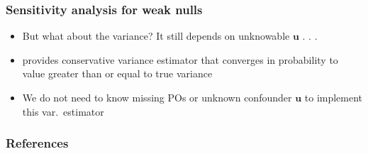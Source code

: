 \documentclass[table, xcolor = {dvipsnames}, 9pt]{beamer}
\theoremstyle{plain}
\begin{document}
\begin{frame}[t]
\frametitle{Sensitivity analysis for weak nulls}
\vfill
\begin{itemize} \vfill
\item But what about the variance? It still depends on unknowable $\bm{u}$ . . .  \vfill
\item \citet{fogarty2018} provides conservative variance estimator that converges in probability to value greater than or equal to true variance \vfill
\item We do not need to know missing POs or unknown confounder $\bm{u}$ to implement this var.~estimator \vfill
\end{itemize}
\vfill
\end{frame}
\begin{frame}[allowframebreaks]
\frametitle{References}
\scriptsize

\end{frame}
\end{document}
